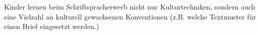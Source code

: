 Kinder lernen beim Schriftspracherwerb nicht nur Kulturtechniken, sondern auch eine Vielzahl an kulturell gewachsenen Konventionen (z.B. welche Textmuster für einen Brief eingesetzt werden.)